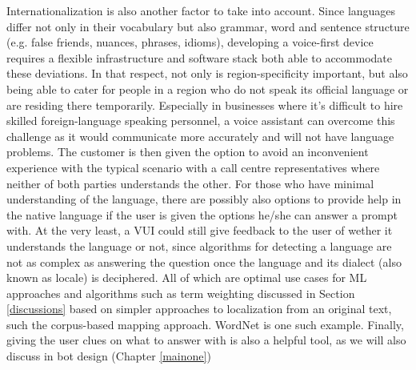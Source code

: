 Internationalization is also another factor to take into account. Since languages differ not only in their vocabulary but also grammar, word and sentence structure (e.g. false friends, nuances, phrases, idioms), developing a voice-first device requires a flexible infrastructure and software stack both able to accommodate these deviations.
In that respect, not only is region-specificity important, but also being able to cater for people in a region who do not speak its official language or are residing there temporarily.
Especially in businesses where it's difficult to hire skilled foreign-language speaking personnel, a voice assistant can overcome this challenge as it would communicate more accurately and will not have language problems.
The customer is then given the option to avoid an inconvenient experience with the typical scenario with a call centre representatives where neither of both parties understands the other.
For those who have minimal understanding of the language, there are possibly also options to provide help in the native language if the user is given the options he/she can answer a prompt with. At the very least, a VUI could still give feedback to the user of wether it understands the language or not, since algorithms for detecting a language are not as complex as answering the question once the language and its dialect (also known as locale) is deciphered. %
All of which are optimal use cases for ML approaches and algorithms such as term weighting discussed in Section \ref{discussions} based on simpler approaches to localization from an original text, such the corpus-based mapping approach. WordNet is one such example. %
Finally, giving the user clues on what to answer with is also a helpful tool, as we will also discuss in bot design (Chapter \ref{mainone})



